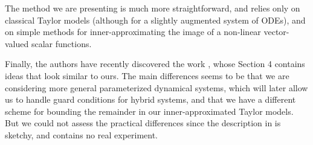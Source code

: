 \documentclass{sig-alternate-05-2015} %
\newcommand\ForAuthors[1]%
 {\par\smallskip                     %
  \begin{center}%
   \fbox%
   {\parbox{0.9\linewidth}%
    {\raggedright\sc--- #1}%
   }%
  \end{center}%
  \par\smallskip                     %
 }
\begin{document}
The method we are presenting is much more straightforward, and relies only on classical
Taylor models (although for a slightly augmented system of ODEs), and on simple methods
for inner-approximating the image of a non-linear vector-valued scalar functions. 

Finally, the authors have recently discovered the work \cite{Gold06}, whose Section 4 contains
ideas that look similar to ours. The main differences seems to be that we are considering more
general parameterized dynamical systems, which will later allow us to handle guard conditions for hybrid systems, 
and that we have a different scheme for bounding
the remainder in our inner-approximated Taylor models. But we could not assess the practical
differences since the description in \cite{Gold06} is sketchy, and contains no real experiment. 






\end{document}
